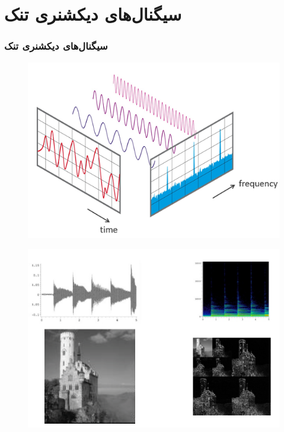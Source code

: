 \section{سیگنال‌های دیکشنری تنک\hfill}
\begin{frame}
\frametitle{سیگنال‌های دیکشنری تنک}
\begin{figure}
\centering
\includegraphics[scale=0.3]{Images/DS.png}
\end{figure}
\begin{figure}
\centering
\includegraphics[scale=0.3]{Images/DS1.png}
\end{figure}
\end{frame}
